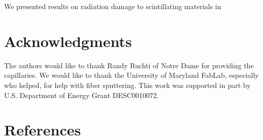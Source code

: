 \documentclass[review]{elsarticle}
\begin{document}
We presented results on radiation damage to scintillating materials
in 


\section{Acknowledgments}
The authors would like to thank Randy Ruchti of Notre Dame for
providing the capillaries.
 We would like to thank the University of Maryland
FabLab, especially {\color{red} who helped}, for help with fiber sputtering.
This work was supported in part by U.S. Department of Energy
Grant DESC0010072.

\section*{References}


\end{document}
